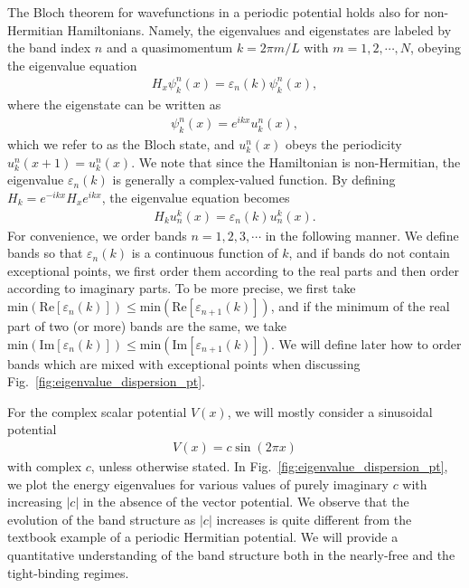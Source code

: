 \documentclass[prb,superscriptaddress,floatfix,twocolumn,showpacs]{revtex4-2}
\begin{document}
The Bloch theorem for wavefunctions in a periodic potential holds also for non-Hermitian Hamiltonians. Namely, the eigenvalues and eigenstates are labeled by the band index $n$ and a quasimomentum $k=2\pi m/L$ with $m=1,2,\cdots,N$, obeying the eigenvalue equation
\begin{align}
    H_x \psi_k^n(x)=\varepsilon_n(k)\psi_k^n(x),
    \label{eq:eigen-equation_x}
\end{align}
where the eigenstate can be written as
\begin{align}
    \psi_k^n(x)=e^{ikx}u_k^n(x),
    \label{eq:bloch-function}
\end{align}
which we refer to as the Bloch state,
and $u_k^n (x)$ obeys the periodicity $u_k^n(x+1) = u_k^n(x)$. We note that since the Hamiltonian is non-Hermitian, the eigenvalue $\varepsilon_n (k)$ is generally a complex-valued function.
By defining $H_k = e^{-ikx}H_x e^{ikx}$, the eigenvalue equation becomes
\begin{align}
    H_k u_n^k(x)=\varepsilon_n(k) u_n^k(x).
    \label{eq:eigen-equation_k}
\end{align}
For convenience, we order bands $n = 1, 2, 3, \cdots$ in the following manner.
We define bands so that $\varepsilon_n(k)$ is a continuous function of $k$, and if bands do not contain exceptional points, we first order them according to the real parts and then order according to imaginary parts. 
To be more precise, we first take $\mathrm{min}\left( \text{Re}[\varepsilon_n(k)] \right) \leq \mathrm{min}\left( \text{Re}[\varepsilon_{n+1}(k)] \right)$, and if the minimum of the real part of two (or more) bands are the same, we take $\mathrm{min}\left( \text{Im}[\varepsilon_n(k)] \right) \leq \mathrm{min}\left( \text{Im}[\varepsilon_{n+1}(k)] \right)$. 
We will define later how to order bands which are mixed with exceptional points when discussing Fig.~\ref{fig:eigenvalue_dispersion_pt}.

For the complex scalar potential $V(x)$, we will mostly consider a sinusoidal potential
\begin{align}
    V(x) = c \sin (2\pi x)
    \label{eq:imaginary-potential}
\end{align}
with complex $c$, unless otherwise stated. 
In Fig.~\ref{fig:eigenvalue_dispersion_pt}, we plot the energy eigenvalues for various values of purely imaginary $c$ with increasing $|c|$ in the absence of the vector potential. 
We observe that the evolution of the band structure as $|c|$ increases is quite different from the textbook example of a periodic Hermitian potential. 
We will provide a quantitative understanding of the band structure both in the nearly-free and the tight-binding regimes.
\end{document}
